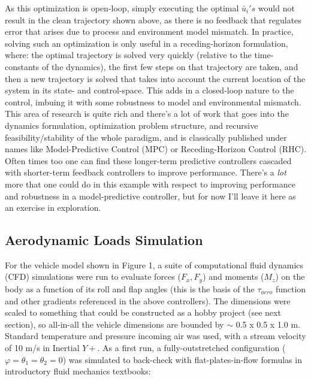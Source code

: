\documentclass[12pt]{article}
\begin{document}
As this optimization is open-loop, simply executing the optimal $\bar{u}_i 's$ would not result in the clean trajectory shown above, as there is no feedback that regulates error that arises due to process and environment model mismatch.  In practice, solving such an optimization is only useful in a receding-horizon formulation, where: the optimal trajectory is solved very quickly (relative to the time-constants of the dynamics), the first few steps on that trajectory are taken, and then a new trajectory is solved that takes into account the current location of the system in its state- and control-space.  This adds in a closed-loop nature to the control, imbuing it with some robustness to model and environmental mismatch.  This area of research is quite rich and there's a lot of work that goes into the dynamics formulation, optimization problem structure, and recursive feasibility/stability of the whole paradigm, and is classically published under names like Model-Predictive Control (MPC) or Receding-Horizon Control (RHC).  Often times too one can find these longer-term predictive controllers cascaded with shorter-term feedback controllers to improve performance.  There's a \textit{lot} more that one could do in this example with respect to improving performance and robustness in a model-predictive controller, but for now I'll leave it here as an exercise in exploration.


\bigskip\bigskip\bigskip\bigskip
\subsection*{Aerodynamic Loads Simulation}

For the vehicle model shown in Figure 1, a suite of computational fluid dynamics (CFD) simulations were run to evaluate forces ($F_x, F_y$) and moments ($M_z$) on the body as a function of its roll and flap angles (this is the basis of the $\tau_{aero}$ function and other gradients referenced in the above controllers). The dimensions were scaled to something that could be constructed as a hobby project (see next section), so all-in-all the vehicle dimensions are bounded by $\sim$ 0.5 x 0.5 x 1.0 m.  Standard temperature and pressure incoming air was used, with a stream velocity of 10 m/s in Inertial $Y+$.  As a first run, a fully-outstretched configuration ($\varphi = \theta_1 = \theta_2 = 0$) was simulated to back-check with flat-plates-in-flow formulas in introductory fluid mechanics textbooks:

\clearpage
\end{document}
